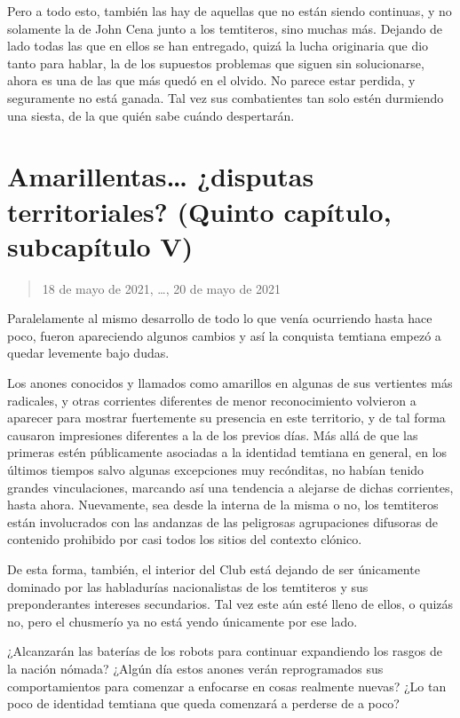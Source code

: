 \documentclass[
  spanish,
]{book}
\begin{document}
Pero a todo esto, también las hay de aquellas que no están siendo continuas, y no solamente la de John Cena junto a los temtiteros, sino muchas más. Dejando de lado todas las que en ellos se han entregado, quizá la lucha originaria que dio tanto para hablar, la de los supuestos problemas que siguen sin solucionarse, ahora es una de las que más quedó en el olvido. No parece estar perdida, y seguramente no está ganada. Tal vez sus combatientes tan solo estén durmiendo una siesta, de la que quién sabe cuándo despertarán.

\hypertarget{amarillentas-disputas-territoriales-quinto-capuxedtulo-subcapuxedtulo-v}{%
\section{Amarillentas\ldots{} ¿disputas territoriales? (Quinto capítulo, subcapítulo V)}\label{amarillentas-disputas-territoriales-quinto-capuxedtulo-subcapuxedtulo-v}}

\begin{quote}
18 de mayo de 2021, \ldots, 20 de mayo de 2021
\end{quote}

Paralelamente al mismo desarrollo de todo lo que venía ocurriendo hasta hace poco, fueron apareciendo algunos cambios y así la conquista temtiana empezó a quedar levemente bajo dudas.

Los anones conocidos y llamados como amarillos en algunas de sus vertientes más radicales, y otras corrientes diferentes de menor reconocimiento volvieron a aparecer para mostrar fuertemente su presencia en este territorio, y de tal forma causaron impresiones diferentes a la de los previos días. Más allá de que las primeras estén públicamente asociadas a la identidad temtiana en general, en los últimos tiempos salvo algunas excepciones muy recónditas, no habían tenido grandes vinculaciones, marcando así una tendencia a alejarse de dichas corrientes, hasta ahora. Nuevamente, sea desde la interna de la misma o no, los temtiteros están involucrados con las andanzas de las peligrosas agrupaciones difusoras de contenido prohibido por casi todos los sitios del contexto clónico.

De esta forma, también, el interior del Club está dejando de ser únicamente dominado por las habladurías nacionalistas de los temtiteros y sus preponderantes intereses secundarios. Tal vez este aún esté lleno de ellos, o quizás no, pero el chusmerío ya no está yendo únicamente por ese lado.

¿Alcanzarán las baterías de los robots para continuar expandiendo los rasgos de la nación nómada? ¿Algún día estos anones verán reprogramados sus comportamientos para comenzar a enfocarse en cosas realmente nuevas? ¿Lo tan poco de identidad temtiana que queda comenzará a perderse de a poco?
\end{document}
